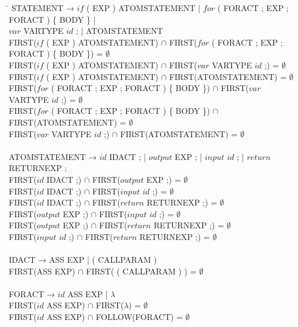 \begin{tabbing}
    \hspace{0.5cm}\=\kill
    STATEMENT → $if$ ( EXP ) ATOMSTATEMENT | $for$ ( FORACT ; EXP ; FORACT ) \{ BODY \} |\\
    $var$ VARTYPE $id$ ; | ATOMSTATEMENT\\
    \>FIRST($if$ ( EXP ) ATOMSTATEMENT) $\cap$ FIRST($for$ ( FORACT ; EXP ; FORACT ) \{ BODY \}) = $\emptyset$\\
    \>FIRST($if$ ( EXP ) ATOMSTATEMENT) $\cap$ FIRST($var$ VARTYPE $id$ ;) = $\emptyset$\\
    \>FIRST($if$ ( EXP ) ATOMSTATEMENT) $\cap$ FIRST(ATOMSTATEMENT) = $\emptyset$\\
    \>FIRST($for$ ( FORACT ; EXP ; FORACT ) \{ BODY \}) $\cap$ FIRST($var$ VARTYPE $id$ ;) = $\emptyset$\\
    \>FIRST($for$ ( FORACT ; EXP ; FORACT ) \{ BODY \}) $\cap$ FIRST(ATOMSTATEMENT) = $\emptyset$\\
    \>FIRST($var$ VARTYPE $id$ ;) $\cap$ FIRST(ATOMSTATEMENT) = $\emptyset$\\
    \\
    ATOMSTATEMENT → $id$ IDACT ; | $output$ EXP ; | $input$ $id$ ; | $return$ RETURNEXP ;\\
    \>FIRST($id$ IDACT ;) $\cap$ FIRST($output$ EXP ;) = $\emptyset$\\
    \>FIRST($id$ IDACT ;) $\cap$ FIRST($input$ $id$ ;) = $\emptyset$\\
    \>FIRST($id$ IDACT ;) $\cap$ FIRST($return$ RETURNEXP ;) = $\emptyset$\\
    \>FIRST($output$ EXP ;) $\cap$ FIRST($input$ $id$ ;) = $\emptyset$\\
    \>FIRST($output$ EXP ;) $\cap$ FIRST($return$ RETURNEXP ;) = $\emptyset$\\
    \>FIRST($input$ $id$ ;) $\cap$ FIRST($return$ RETURNEXP ;) = $\emptyset$\\
    \\
    IDACT → ASS EXP | ( CALLPARAM )\\
    \>FIRST(ASS EXP) $\cap$ FIRST( ( CALLPARAM ) ) = $\emptyset$\\
    \\
    FORACT → $id$ ASS EXP | $\lambda$\\
    \>FIRST($id$ ASS EXP) $\cap$ FIRST($\lambda$) = $\emptyset$\\
    \>FIRST($id$ ASS EXP) $\cap$ FOLLOW(FORACT) = $\emptyset$\\
    \\

\end{tabbing}
